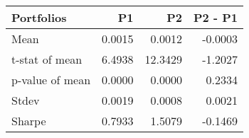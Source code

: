 \begin{tabular}{lrrr}
\toprule
Portfolios & P1 & P2 & P2 - P1 \\
\midrule
Mean & 0.0015 & 0.0012 & -0.0003 \\
t-stat of mean & 6.4938 & 12.3429 & -1.2027 \\
p-value of mean & 0.0000 & 0.0000 & 0.2334 \\
Stdev & 0.0019 & 0.0008 & 0.0021 \\
Sharpe & 0.7933 & 1.5079 & -0.1469 \\
\bottomrule
\end{tabular}

